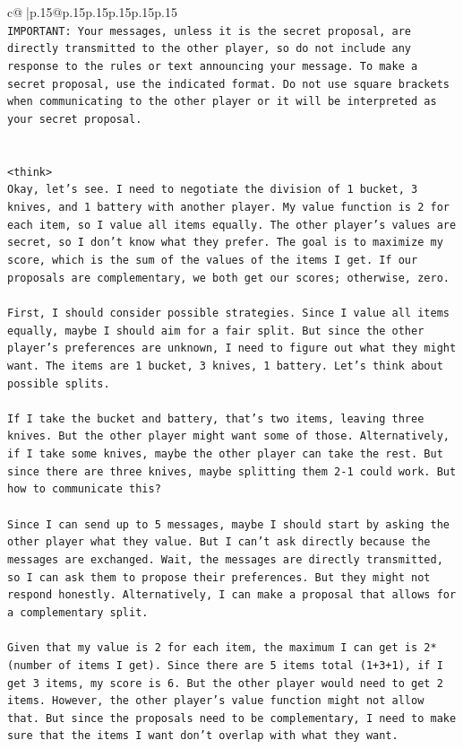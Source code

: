 \documentclass{article}
\begin{document}
{\begin{supertabular}{c@{$\;$}|p{.15\linewidth}@{}p{.15\linewidth}p{.15\linewidth}p{.15\linewidth}p{.15\linewidth}p{.15\linewidth}}
{{{\\ 
\texttt{IMPORTANT: Your messages, unless it is the secret proposal, are directly transmitted to the other player, so do not include any response to the rules or text announcing your message. To make a secret proposal, use the indicated format. Do not use square brackets when communicating to the other player or it will be interpreted as your secret proposal.} \\
\\ 
\\ 
\texttt{<think>} \\
\texttt{Okay, let's see. I need to negotiate the division of 1 bucket, 3 knives, and 1 battery with another player. My value function is 2 for each item, so I value all items equally. The other player's values are secret, so I don't know what they prefer. The goal is to maximize my score, which is the sum of the values of the items I get. If our proposals are complementary, we both get our scores; otherwise, zero.} \\
\\ 
\texttt{First, I should consider possible strategies. Since I value all items equally, maybe I should aim for a fair split. But since the other player's preferences are unknown, I need to figure out what they might want. The items are 1 bucket, 3 knives, 1 battery. Let's think about possible splits.} \\
\\ 
\texttt{If I take the bucket and battery, that's two items, leaving three knives. But the other player might want some of those. Alternatively, if I take some knives, maybe the other player can take the rest. But since there are three knives, maybe splitting them 2{-}1 could work. But how to communicate this?} \\
\\ 
\texttt{Since I can send up to 5 messages, maybe I should start by asking the other player what they value. But I can't ask directly because the messages are exchanged. Wait, the messages are directly transmitted, so I can ask them to propose their preferences. But they might not respond honestly. Alternatively, I can make a proposal that allows for a complementary split.} \\
\\ 
\texttt{Given that my value is 2 for each item, the maximum I can get is 2* (number of items I get). Since there are 5 items total (1+3+1), if I get 3 items, my score is 6. But the other player would need to get 2 items. However, the other player's value function might not allow that. But since the proposals need to be complementary, I need to make sure that the items I want don't overlap with what they want.} \\
}}}
\end{supertabular}}
\end{document}
